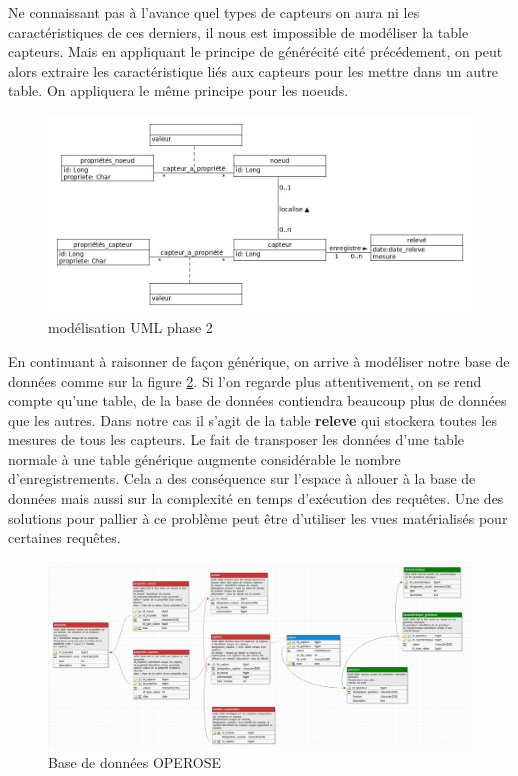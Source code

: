 Ne connaissant pas à l'avance quel types de capteurs on aura ni les caractéristiques de ces derniers, il nous est impossible de modéliser la table capteurs. Mais en appliquant le principe de générécité cité précédement, on peut alors extraire les caractéristique liés aux capteurs pour les mettre dans un autre table. On appliquera le même principe pour les noeuds.
\begin{figure}[!h]
   \begin{center}
        \includegraphics[width=1\textwidth]{images/uml_image2.jpg}
    \caption{modélisation UML phase 2}
    \label{fig:modélisation UML phase 2}
   \end{center}
\end{figure}
En continuant à raisonner de façon générique, on arrive à modéliser notre base de données comme sur la figure \ref{ Base de données OPEROSE}. Si l'on regarde plus attentivement, on se rend compte qu'une table, de la base de données contiendra beaucoup plus de données que les autres. Dans notre cas il s'agit de la table \textbf{releve} qui stockera toutes les mesures de tous les capteurs. Le fait de transposer les données d'une table normale à une table générique augmente considérable le nombre d'enregistrements. Cela a des conséquence sur l'espace à allouer à la base de données mais aussi sur la complexité en temps d'exécution des requêtes. Une des solutions pour pallier à ce problème peut être d'utiliser les vues matérialisés pour certaines requêtes.


\begin{landscape}
\begin{figure}
   \begin{center}
       \includegraphics[width=1.8\textwidth]{images/bd_image3.jpg}
    \caption{ Base de données OPEROSE}
     \label{ Base de données OPEROSE}
   \end{center}
\end{figure}
\end{landscape}







